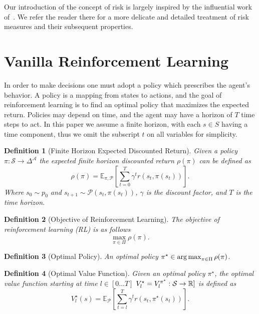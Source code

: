 \documentclass[10pt]{article}
\newtheorem{definition}{Definition}
\renewcommand{\cite}{\citep}
\theoremstyle{plain}
\theoremstyle{remark}
\begin{document}
Our introduction of the concept of risk is largely inspired by the influential work of~\cite{follmer2016}. We refer the reader there for a more delicate and detailed treatment of risk measures and their subsequent properties.

\section{Vanilla Reinforcement Learning}

In order to make decisions one must adopt a policy which prescribes the agent's behavior.
A policy is a mapping from states to actions, and the goal of reinforcement learning is to find an optimal policy that maximizes the expected return.
Policies may depend on time, and the agent may have a horizon of $T$ time steps to act. 
In this paper we assume a finite horizon, with each $s \in S$ having a time component, thus we omit the subscript $t$ on all variables for simplicity.

\begin{definition}[Finite Horizon Expected Discounted Return]
        Given a policy $\pi : \mathcal{S} \to \Delta^\mathcal{A}$ the expected finite horizon discounted return $\rho(\pi)$ can be defined as
        \[ 
                \rho(\pi) = \mathbb{E}_{\pi, \mathcal{P}} \left[ \sum_{t=0}^{T} \gamma^t r(s_t, \pi(s_t)) \right].
        \]
        Where $s_0 \sim p_0$ and $s_{t+1} \sim \mathcal{P}(s_t, \pi(s_t))$, $\gamma$ is the discount factor, and $T$ is the time horizon.
\end{definition}

\begin{definition}[Objective of Reinforcement Learning]\label{def:rl_obj}
        The objective of reinforcement learning (RL) is as follows
        \[
        \max_{\pi \in \Pi} \rho(\pi). 
        \]
\end{definition}

\begin{definition}[Optimal Policy]\label{def:optimal_policy}
        An optimal policy $\pi^\star \in \operatorname*{arg\,max}_{\pi \in \Pi} \rho(\pi)$.
\end{definition}

\begin{definition}[Optimal Value Function]\label{def:optimal_value_function}
        Given an optimal policy $\pi^\star$, the optimal value function starting at time $l \in [0...T]$ $V^\star_l = V^{\pi^\star}_l : \mathcal{S} \to \mathbb{R}]$ is defined as
        \[
                V^\star_l(s) = \mathbb{E}_{\mathcal{P}} \left[ \sum_{t=l}^{T} \gamma^t r(s_t, \pi^\star(s_t)) \right].
        \]
\end{definition}
\end{document}
